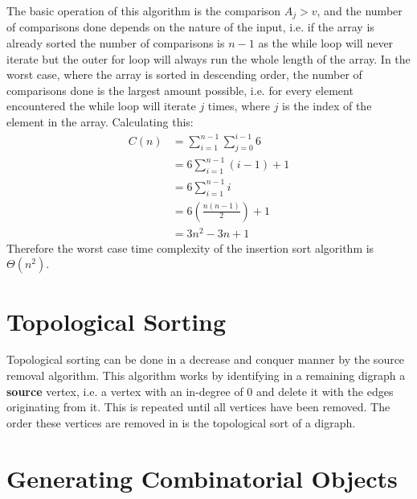 \documentclass[12pt letter]{report}
\begin{document}
The basic operation of this algorithm is the comparison $A_j > v$, and the number of comparisons done depends on the
nature of the input, i.e. if the array is already sorted the number of comparisons is $n-1$ as the while loop will never
iterate but the outer for loop will always run the whole length of the array. In the worst case, where the array is
sorted in descending order, the number of comparisons done is the largest amount possible, i.e. for every element
encountered the while loop will iterate $j$ times, where $j$ is the index of the element in the array. Calculating this:
\begin{align*}
  C \left( n \right) & = \displaystyle\sum_{i=1}^{n-1} \displaystyle\sum_{j=0}^{i-1} 6 \\
                     & = 6\displaystyle\sum_{i=1}^{n-1} \left( i - 1 \right) + 1       \\
                     & = 6 \displaystyle\sum_{i=1}^{n-1} i                             \\
                     & =  6 \left( \frac{n \left( n - 1 \right)}{2} \right) + 1        \\
                     & =  3n^{2} - 3n + 1
\end{align*}
Therefore the worst case time complexity of the insertion sort algorithm is $\Theta \left( n^{2} \right) $.

\chapter{Topological Sorting}


Topological sorting can be done in a decrease and conquer manner by the source removal algorithm. This algorithm works by
identifying in a remaining digraph a \textbf{source} vertex, i.e. a vertex with an in-degree of 0 and delete it with the
edges originating from it. This is repeated until all vertices have been removed. The order these vertices are removed
in is the topological sort of a digraph.

\chapter{Generating Combinatorial Objects}
\end{document}
